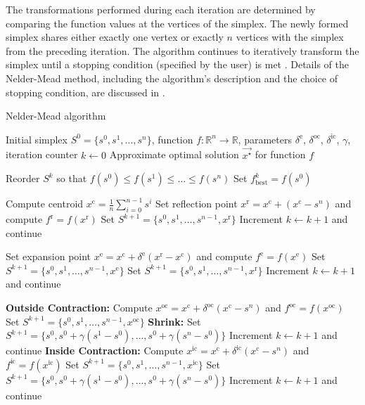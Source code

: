 The transformations performed during each iteration are determined by comparing the function values at the vertices of the simplex. The newly formed simplex shares either exactly one vertex or exactly $ n $ vertices with the simplex from the preceding iteration. The algorithm continues to iteratively transform the simplex until a stopping condition (specified by the user) is met \cite{BBO-textbook}. Details of the Nelder-Mead method, including the algorithm's description and the choice of stopping condition, are discussed in \cite{BBO-textbook, derivative-free-review, Nelder1965}.

\begin{algorithm}
	\caption{Nelder-Mead algorithm}\label{neldermead}
	\begin{algorithmic}[1]
		\Require Initial simplex $S^0 = \{s^0, s^1, \dots, s^n\}$, function $f: \mathbb{R}^n \to \mathbb{R}$, parameters $\delta^{\text{e}}$, $\delta^{\text{oc}}$, $\delta^{\text{ic}}$, $\gamma$, iteration counter $k \gets 0$
		\Ensure Approximate optimal solution $\vec{x^{\star}}$ for function $f$
		
		\State Reorder $S^k$ so that $f(s^0) \leq f(s^1) \leq \dots \leq f(s^n)$
		\State Set $f^k_{\text{best}} = f(s^0)$
		
		\State Compute centroid $x^{\text{c}} = \frac{1}{n} \sum_{i=0}^{n-1} s^i$
		\State Set reflection point $x^{\text{r}} = x^{\text{c}} + (x^{\text{c}} - s^n)$ and compute $f^{\text{r}} = f(x^{\text{r}})$
		\State Set $S^{k+1} = \{s^0, s^1, \dots, s^{n-1}, x^{\text{r}}\}$
		\State Increment $k \gets k+1$ and continue
		\EndIf
		
		\State Set expansion point $x^{\text{e}} = x^{\text{c}} + \delta^{\text{e}} (x^{\text{r}} - x^{\text{c}})$ and compute $f^{\text{e}} = f(x^{\text{e}})$
		\State Set $S^{k+1} = \{s^0, s^1, \dots, s^{n-1}, x^\text{e}\}$
		\Else
		\State Set $S^{k+1} = \{s^0, s^1, \dots, s^{n-1}, x^\text{r}\}$
		\EndIf
		\State Increment $k \gets k+1$ and continue
		\EndIf
		
		\State \textbf{Outside Contraction:} Compute $x^\text{oc} = x^\text{c} + \delta^{\text{oc}}(x^\text{c} - s^n)$ and $f^{\text{oc}} = f(x^{\text{oc}})$
		\State Set $S^{k+1} = \{s^0, s^1, \dots, s^{n-1}, x^{\text{oc}}\}$
		\Else
		\State \textbf{Shrink:} Set $S^{k+1} = \{s^0, s^0 + \gamma(s^1 - s^0), \dots, s^0 + \gamma(s^n - s^0)\}$
		\EndIf
		\State Increment $k \gets k+1$ and continue
		\Else
		\State \textbf{Inside Contraction:} Compute $x^{\text{ic}} = x^\text{c} + \delta^{\text{ic}}(x^\text{c} - s^n)$ and $f^{\text{ic}} = f(x^{\text{ic}})$
		\State Set $S^{k+1} = \{s^0, s^1, \dots, s^{n-1}, x^{\text{ic}}\}$
		\Else
		\State Set $S^{k+1} = \{s^0, s^0 + \gamma(s^1 - s^0), \dots, s^0 + \gamma(s^n - s^0)\}$
		\EndIf
		\State Increment $k \gets k+1$ and continue
		\EndIf
		\EndWhile
		\EndProcedure
	\end{algorithmic}
\end{algorithm}

